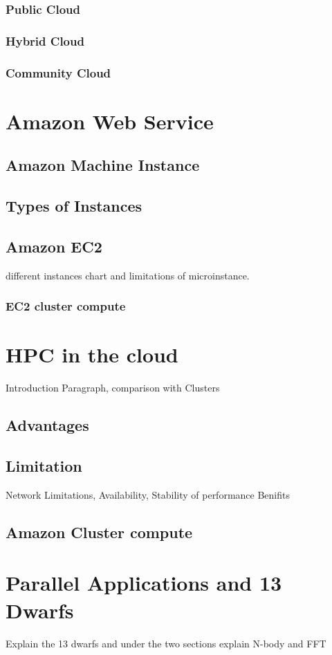 \documentclass[12pt,a4paper]{report}
\begin{document}
\subsubsection{Public Cloud}
\subsubsection{Hybrid Cloud}
\subsubsection{Community Cloud}

\section{Amazon Web Service}
\subsection{Amazon Machine Instance}
\subsection{Types of Instances}
\subsection{Amazon EC2}
different instances chart and limitations of microinstance.
\subsubsection{EC2 cluster compute}

\section{HPC in the cloud}
Introduction Paragraph, comparison with Clusters
\subsection{Advantages}
\subsection{Limitation}
Network Limitations, Availability, Stability of performance
Benifits
\subsection{Amazon Cluster compute}

\section{Parallel Applications and 13 Dwarfs}
Explain the 13 dwarfs and under the two sections explain N-body and FFT
\end{document}
